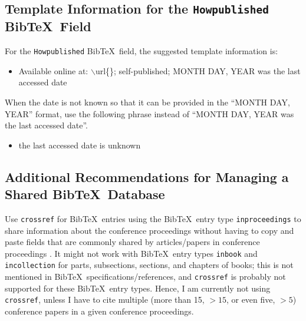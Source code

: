 \documentclass[letter,12pt]{article}
\begin{document}
\subsection{Template Information for the {\tt Howpublished} {\sc Bib}\TeX\ Field}
\label{ssec:TemplateInformationForTheHowpublishedBibTeXField}

For the {\tt Howpublished} {\sc Bib}\TeX\ field, the suggested template information is: \vspace{-0.3cm}
\begin{itemize} \itemsep -4pt
\item Available online at: $\backslash$url\{\}; self-published; MONTH DAY, YEAR was the last accessed date
\end{itemize}

When the date is not known so that it can be provided in the ``MONTH DAY, YEAR'' format, use the following phrase instead of ``MONTH DAY, YEAR was the last accessed date''. \vspace{-0.3cm}
\begin{itemize} \itemsep -4pt
\item the last accessed date is unknown
\end{itemize}










\subsection{Additional Recommendations for Managing a Shared {\sc Bib}\TeX\ Database}
\label{ssec:AdditionalRecommendationsForManagingASharedBibTeXDatabase}



Use {\tt crossref} for {\sc Bib}\TeX\ entries using the {\sc Bib}\TeX\ entry type {\tt inproceedings} to share information about the conference proceedings without having to copy and paste fields that are commonly shared by articles/papers in conference proceedings \cite[\S12.2.3, pp. 234]{Kopka2004}. It might not work with {\sc Bib}\TeX\ entry types {\tt inbook} and {\tt incollection} for parts, subsections, sections, and chapters of books; this is not mentioned in {\sc Bib}\TeX\ specifications/references, and {\tt crossref} is probably not supported for these {\sc Bib}\TeX\ entry types. Hence, I am currently not using {\tt crossref}, unless I have to cite multiple (more than 15, $>15$, or even five, $>5$) conference papers in a given conference proceedings. \\
\end{document}
